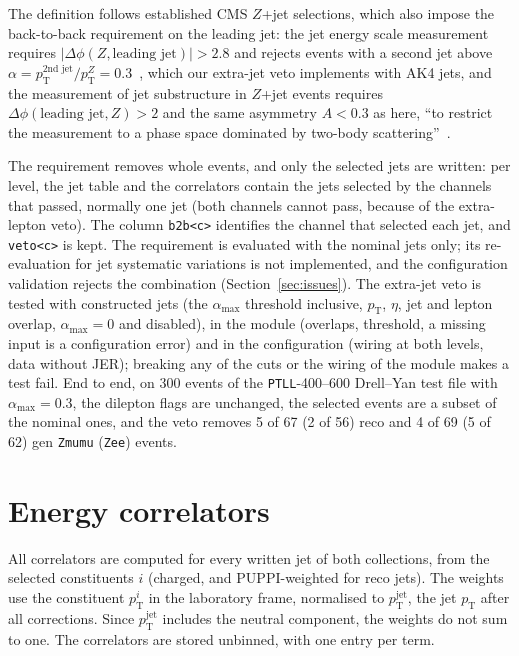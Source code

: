\documentclass[11pt]{article}
\newcommand{\pt}{p_{\mathrm{T}}}
\newcommand{\ptj}{\pt^{\mathrm{jet}}}
\newcommand{\code}[1]{\texttt{#1}}
\begin{document}
The definition follows established CMS $Z$+jet selections, which also impose the back-to-back requirement on the
leading jet: the jet energy scale measurement requires $|\Delta\phi(Z, \text{leading jet})| > 2.8$ and rejects events
with a second jet above $\alpha = \pt^{\text{2nd jet}}/\pt^{Z} = 0.3$~\cite[Sec.~3.2]{CMS:2016lmd}, which our
extra-jet veto implements with AK4 jets, and the measurement of jet substructure in $Z$+jet events requires
$\Delta\phi(\text{leading jet}, Z) > 2$ and the same asymmetry $A < 0.3$ as here, ``to restrict the measurement to a
phase space dominated by two-body scattering''~\cite[Sec.~4]{CMS:2021iwu}.

The requirement removes whole events, and only the selected jets are written: per level, the jet table and the
correlators contain the jets selected by the channels that passed, normally one jet (both channels cannot pass, because
of the extra-lepton veto). The column \code{b2b<c>} identifies the channel that selected each jet, and \code{veto<c>} is
kept. The requirement is evaluated with the nominal jets only; its re-evaluation for jet systematic variations is not
implemented, and the configuration validation rejects the combination (Section~\ref{sec:issues}). The extra-jet veto is
tested with constructed jets (the $\alpha_\mathrm{max}$ threshold inclusive, $\pt$, $\eta$, jet and lepton overlap,
$\alpha_\mathrm{max} = 0$ and disabled), in the module (overlaps, threshold, a missing input is a configuration error)
and in the configuration (wiring at both levels, data without JER); breaking any of the cuts or the wiring of the
module makes a test fail. End to end, on 300 events of the \code{PTLL}-400--600 Drell--Yan test file with
$\alpha_\mathrm{max} = 0.3$, the dilepton flags are unchanged, the selected events are a subset of the nominal ones, and
the veto removes 5 of 67 (2 of 56) reco and 4 of 69 (5 of 62) gen \code{Zmumu} (\code{Zee}) events.

\section{Energy correlators}
\label{sec:eec}

All correlators are computed for every written jet of both collections, from the selected constituents $i$ (charged,
and PUPPI-weighted for reco jets). The weights use the constituent $\pt^i$ in the laboratory frame, normalised to
$\ptj$, the jet $\pt$ after all corrections. Since $\ptj$ includes the neutral component, the weights do not sum to one.
The correlators are stored unbinned, with one entry per term.
\end{document}
